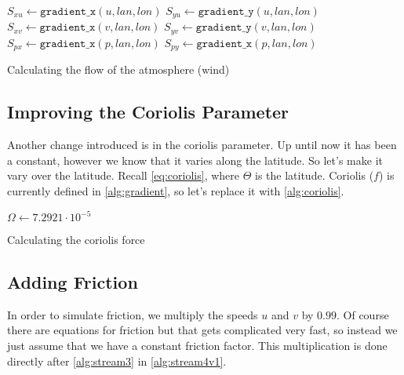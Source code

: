 \begin{algorithm}
    $S_{xu} \leftarrow \texttt{gradient\_x}(u, lan, lon)$ \;
    $S_{yu} \leftarrow \texttt{gradient\_y}(u, lan, lon)$ \;
    $S_{xv} \leftarrow \texttt{gradient\_x}(v, lan, lon)$ \;
    $S_{yv} \leftarrow \texttt{gradient\_y}(v, lan, lon)$ \;
    $S_{px} \leftarrow \texttt{gradient\_x}(p, lan, lon)$ \;
    $S_{py} \leftarrow \texttt{gradient\_x}(p, lan, lon)$ \;
    \caption{Calculating the flow of the atmosphere (wind)}
    \label{alg:stream3}
\end{algorithm}

\subsection{Improving the Coriolis Parameter}
Another change introduced is in the coriolis parameter. Up until now it has been a constant, however we know that it varies along the latitude. So let's make it vary over the latitude. Recall 
\autoref{eq:coriolis}, where $\Theta$ is the latitude. Coriolis ($f$) is currently defined in \autoref{alg:gradient}, so let's replace it with \autoref{alg:coriolis}.

\begin{algorithm}
    \SetAlgoLined
    $\Omega \leftarrow 7.2921 \cdot 10^{-5}$ \;

    \caption{Calculating the coriolis force}
    \label{alg:coriolis}
\end{algorithm}

\subsection{Adding Friction}
In order to simulate friction, we multiply the speeds $u$ and $v$ by $0.99$. Of course there are equations for friction but that gets complicated very fast, so instead we just assume that we
have a constant friction factor. This multiplication is done directly after \autoref{alg:stream3} in \autoref{alg:stream4v1}.

